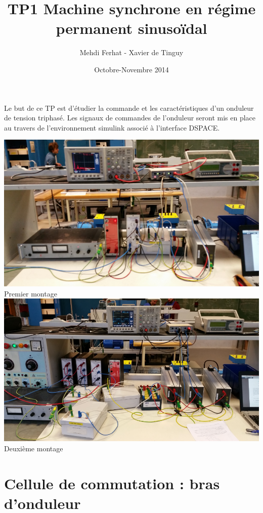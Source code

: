 \documentclass[10pt,a4paper]{article}
\title{TP1 Machine synchrone en régime permanent sinusoïdal}
\author{Mehdi Ferhat - Xavier de Tinguy}
\date{Octobre-Novembre 2014}
\begin{document}
	\newcommand{\nomentete}{TP1 -- Mehdi Ferhat - Xavier de Tinguy}
	\lstset{inputencoding=utf8/latin1}
	\lstset{language=Matlab}
	\maketitle
	\bigbreak
	\bigbreak
	Le but de ce TP est d'étudier la commande et les caractéristiques d'un onduleur de tension triphasé. Les signaux de commandes de l'onduleur seront mis en place au travers de l'environnement simulink associé à l'interface DSPACE.
	\begin{center}
	\includegraphics[scale=0.5]{intro1.png}\\
	Premier montage
	\bigbreak
	\includegraphics[scale=0.428]{intro2.png}\\
	Deuxième montage
	\end{center}

	\newpage
	
	\section{Cellule de commutation : bras d'onduleur}
	
\end{document}
